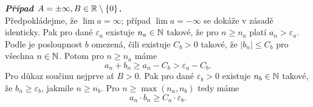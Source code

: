 \begin{thmproof}
 \textbf{\emph{Případ $A = \pm \infty, B \in \mathbb{R} \setminus \{0\}$.}}\\
 Předpokládejme, že $\lim a = \infty$; případ $\lim a = -\infty$ se dokáže v
 zásadě identicky. Pak pro dané $\varepsilon_a$ existuje $n_a \in \mathbb{N}$ takové, že
 pro $n \geq n_a$ platí $a_n > \varepsilon_a$. Podle
  je posloupnost $b$ omezená, čili
 existuje $C_b > 0$ takové, že $|b_n| \leq C_b$ pro všechna $n \in \mathbb{N}$. Potom
 pro $n \geq n_a$ máme
 \[
  a_n + b_n \geq a_n - C_b > \varepsilon_a - C_b.
 \]
 Pro důkaz součinu nejprve ať $B > 0$. Pak pro dané $\varepsilon_b > 0$ existuje
 $n_b \in \mathbb{N}$ takové, že $b_n \geq \varepsilon_b$, jakmile $n \geq n_b$. Pro $n
 \geq \max(n_a,n_b)$ tedy máme
 \[
  a_n \cdot b_n \geq C_a \cdot \varepsilon_b.
 \]
\end{thmproof}
